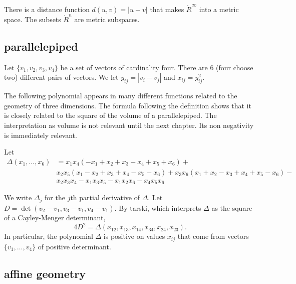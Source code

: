 There is a distance function $d(u,v) = | u - v|$ that makes
$\ring{R}^\infty$ into a metric space.  The subsets $\ring{R}^n$ are
metric subspaces.






\subsection{parallelepiped}

Let $\{v_1,v_2,v_3,v_4\}$ be a set of vectors of cardinality four.
There are $6$ (four choose two) different pairs of vectors. We let
$y_{ij} = |v_i-v_j|$ and $x_{ij}=y_{ij}^2$.

The following polynomial appears in many different functions related to the geometry of three dimensions.  The formula following the definition shows that it is closely related to the square of the volume of a parallelepiped.  The interpretation as  volume is not relevant until the next chapter.  Its non negativity is immediately relevant. 

\begin{definition}[$\Delta$]\label{def:delta}  Let 
$$
\begin{array}{lll}
\Delta(x_1,\ldots,x_6) &= x_1 x_4 (- x_1+x_2+x_3- x_4+x_5+x_6)+\\&
            x_2 x_5 (x_1- x_2+x_3+x_4- x_5+x_6)
            +x_3 x_6 (x_1+x_2- x_3+x_4+x_5- x_6)
            - \\&x_2 x_3 x_4- x_1 x_3 x_5- x_1 x_2 x_6- x_4 x_5 x_6
\end{array}
$$
\end{definition}

We write $\Delta_j$ for the $j$th partial derivative of $\Delta$. 
Let $D = \det(v_2-v_1,v_3-v_1,v_4-v_1)$.
By tarski, which interprets $\Delta$
as the square of a Cayley-Menger determinant,
  $$
  4 D^2 = \Delta(x_{12},x_{13},x_{14},x_{34},x_{24},x_{23}).
  $$
In particular, the polynomial $\Delta$ is positive on values $x_{ij}$
that come from vectors $\{v_1,\ldots,v_4\}$ of positive determinant.





\subsection{affine geometry}


